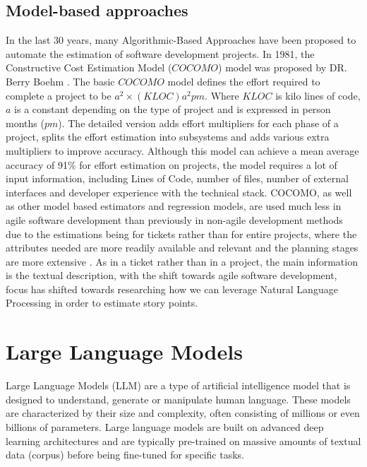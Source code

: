 \documentclass{UoYCSproject}
\begin{document}
    \subsection{Model-based approaches}\label{subsec:model-based-approaches}
    In the last 30 years, many Algorithmic-Based Approaches have been proposed to automate the estimation of software development projects.
    In 1981, the Constructive Cost Estimation Model ($COCOMO$) model was proposed by DR. Berry Boehm \cite{Boehm2001}.
    The basic $COCOMO$ model defines the effort required to complete a project to be $a^2 \times (KLOC)a^2pm$.
    Where $KLOC$ is kilo lines of code, $a$ is a constant depending on the type of project and is expressed in person months ($pm$). The detailed version adds effort multipliers for each phase of a project, splits the effort estimation into subsystems and adds various extra multipliers to improve accuracy.
    Although this model can achieve a mean average accuracy of 91\% for effort estimation on projects, the model requires a lot of input information, including Lines of Code, number of files, number of external interfaces and developer experience with the technical stack.
    COCOMO, as well as other model based estimators and regression models, are used much less in agile software development than previously in non-agile development methods due to the estimations being for tickets rather than for entire projects, where the attributes needed are more readily available and relevant and the planning stages are more extensive \cite{effortestimationsurvey}.
    As in a ticket rather than in a project, the main information is the textual description, with the shift towards agile software development, focus has shifted towards researching how we can leverage Natural Language Processing in order to estimate story points.




    \section{Large Language Models}
    \label{sec:large-language-models}
    Large Language Models (LLM) are a type of artificial intelligence model that is designed to understand, generate
    or manipulate human language.
    These models are characterized by their size and complexity, often consisting of millions or even billions of parameters.
    Large language models are built on advanced deep learning architectures and are typically pre-trained on massive amounts of textual data (corpus) before being fine-tuned for specific tasks. \par
\end{document}

